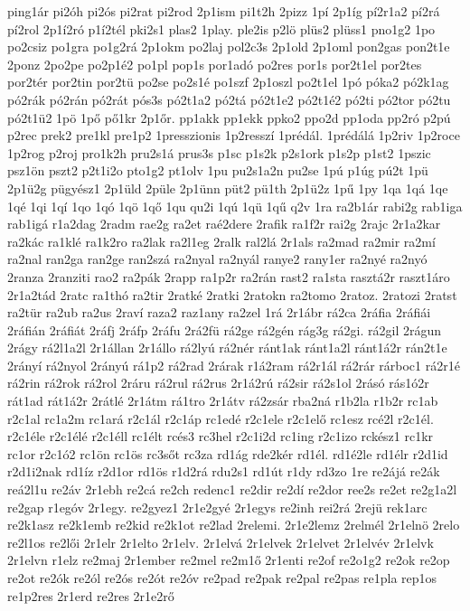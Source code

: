 {ping1ár
pi2óh
pi2ós
pi2rat
pi2rod
2p1ism
pi1t2h
2pizz
1pí
2p1íg
pí2r1a2
pí2rá
pí2rol
2p1í2ró
p1í2tél
pki2s1
plas2
1play.
ple2is
p2lö
plüs2
plüss1
pno1g2
1po
po2csiz
po1gra
po1g2rá
2p1okm
po2laj
pol2c3s
2p1old
2p1oml
pon2gas
pon2t1e
2ponz
2po2pe
po2p1é2
po1pl
pop1s
por1adó
po2res
por1s
por2t1el
por2tes
por2tér
por2tin
por2tü
po2se
po2s1é
po1szf
2p1oszl
po2t1el
1pó
póka2
pó2k1ag
pó2rák
pó2rán
pó2rát
pós3s
pó2t1a2
pó2tá
pó2t1e2
pó2t1é2
pó2ti
pó2tor
pó2tu
pó2t1ü2
1pö
1pő
pő1kr
2p1őr.
pp1akk
pp1ekk
ppko2
ppo2d
pp1oda
pp2ró
p2pú
p2rec
prek2
pre1kl
pre1p2
1presszionis
1p2resszí
1prédál.
1prédálá
1p2riv
1p2roce
1p2rog
p2roj
pro1k2h
pru2s1á
prus3s
p1sc
p1s2k
p2s1ork
p1s2p
p1st2
1pszic
psz1ön
pszt2
p2t1i2o
pto1g2
pt1olv
1pu
pu2s1a2n
pu2se
1pú
p1úg
pú2t
1pü
2p1ü2g
pügyész1
2p1üld
2püle
2p1ünn
püt2
pü1th
2p1ü2z
1pű
1py
1qa
1qá
1qe
1qé
1qi
1qí
1qo
1qó
1qö
1qő
1qu
qu2i
1qú
1qü
1qű
q2v
1ra
ra2b1ár
rabi2g
rab1iga
rab1igá
r1a2dag
2radm
rae2g
ra2et
raé2dere
2rafik
ra1f2r
rai2g
2rajc
2r1a2kar
ra2kác
ra1klé
ra1k2ro
ra2lak
ra2l1eg
2ralk
ral2lá
2r1als
ra2mad
ra2mir
ra2mí
ra2nal
ran2ga
ran2ge
ran2szá
ra2nyal
ra2nyál
ranye2
rany1er
ra2nyé
ra2nyó
2ranza
2ranziti
rao2
ra2pák
2rapp
ra1p2r
ra2rán
rast2
ra1sta
rasztá2r
raszt1áro
2r1a2tád
2ratc
ra1thó
ra2tir
2ratké
2ratki
2ratokn
ra2tomo
2ratoz.
2ratozi
2ratst
ra2tür
ra2ub
ra2us
2raví
raza2
raz1any
ra2zel
1rá
2r1ábr
rá2ca
2ráfia
2ráfiái
2ráfián
2ráfiát
2ráfj
2ráfp
2ráfu
2rá2fü
rá2ge
rá2gén
rág3g
rá2gi.
rá2gil
2rágun
2rágy
rá2l1a2l
2r1állan
2r1állo
rá2lyú
rá2nér
ránt1ak
ránt1a2l
ránt1á2r
rán2t1e
2rányí
rá2nyol
2rányú
rá1p2
rá2rad
2rárak
r1á2ram
rá2r1ál
rá2rár
rárboc1
rá2r1é
rá2rin
rá2rok
rá2rol
2ráru
rá2rul
rá2rus
2r1á2rú
rá2sir
rá2s1ol
2rásó
rás1ó2r
rát1ad
rát1á2r
2rátlé
2r1átm
rá1tro
2r1átv
rá2zsár
rba2ná
r1b2la
r1b2r
rc1ab
r2c1al
rc1a2m
rc1ará
r2c1ál
r2c1áp
rc1edé
r2c1ele
r2c1elő
rc1esz
rcé2l
r2c1él.
r2c1éle
r2c1élé
r2c1éll
rc1élt
rcés3
rc3hel
r2c1i2d
rc1ing
r2c1izo
rckész1
rc1kr
rc1or
r2c1ó2
rc1ön
rc1ös
rc3sőt
rc3za
rd1ág
rde2kér
rd1él.
rd1é2le
rd1élr
r2d1id
r2d1i2nak
rd1íz
r2d1or
rd1ös
r1d2rá
rdu2s1
rd1út
r1dy
rd3zo
1re
re2ájá
re2ák
reá2l1u
re2áv
2r1ebh
re2cá
re2ch
redenc1
re2dir
re2dí
re2dor
ree2s
re2et
re2g1a2l
re2gap
r1egóv
2r1egy.
re2gyez1
2r1e2gyé
2r1egys
re2inh
rei2rá
2rejü
rek1arc
re2k1asz
re2k1emb
re2kid
re2k1ot
re2lad
2relemi.
2r1e2lemz
2relmél
2r1elnö
2relo
re2l1os
re2lői
2r1elr
2r1elto
2r1elv.
2r1elvá
2r1elvek
2r1elvet
2r1elvév
2r1elvk
2r1elvn
r1elz
re2maj
2r1ember
re2mel
re2m1ő
2r1enti
re2of
re2o1g2
re2ok
re2op
re2ot
re2ók
re2ól
re2ós
re2ót
re2óv
re2pad
re2pak
re2pal
re2pas
re1pla
rep1os
re1p2res
2r1erd
re2res
2r1e2rő
}
